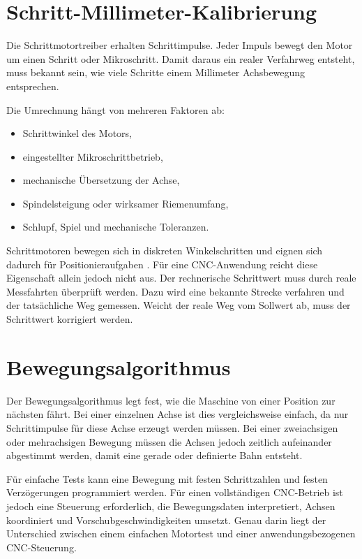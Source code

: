 \section{Schritt-Millimeter-Kalibrierung}
\label{sec:schritt_mm_kalibrierung}

Die Schrittmotortreiber erhalten Schrittimpulse. Jeder Impuls bewegt den Motor um einen Schritt oder Mikroschritt. Damit daraus ein realer Verfahrweg entsteht, muss bekannt sein, wie viele Schritte einem Millimeter Achsbewegung entsprechen.

Die Umrechnung hängt von mehreren Faktoren ab:

\begin{itemize}
	\item Schrittwinkel des Motors,
	\item eingestellter Mikroschrittbetrieb,
	\item mechanische Übersetzung der Achse,
	\item Spindelsteigung oder wirksamer Riemenumfang,
	\item Schlupf, Spiel und mechanische Toleranzen.
\end{itemize}

Schrittmotoren bewegen sich in diskreten Winkelschritten und eignen sich dadurch für Positionieraufgaben \cite{Schroeder:2017}. Für eine CNC-Anwendung reicht diese Eigenschaft allein jedoch nicht aus. Der rechnerische Schrittwert muss durch reale Messfahrten überprüft werden. Dazu wird eine bekannte Strecke verfahren und der tatsächliche Weg gemessen. Weicht der reale Weg vom Sollwert ab, muss der Schrittwert korrigiert werden.

\section{Bewegungsalgorithmus}
\label{sec:bewegungsalgorithmus}

Der Bewegungsalgorithmus legt fest, wie die Maschine von einer Position zur nächsten fährt. Bei einer einzelnen Achse ist dies vergleichsweise einfach, da nur Schrittimpulse für diese Achse erzeugt werden müssen. Bei einer zweiachsigen oder mehrachsigen Bewegung müssen die Achsen jedoch zeitlich aufeinander abgestimmt werden, damit eine gerade oder definierte Bahn entsteht.

Für einfache Tests kann eine Bewegung mit festen Schrittzahlen und festen Verzögerungen programmiert werden. Für einen vollständigen CNC-Betrieb ist jedoch eine Steuerung erforderlich, die Bewegungsdaten interpretiert, Achsen koordiniert und Vorschubgeschwindigkeiten umsetzt. Genau darin liegt der Unterschied zwischen einem einfachen Motortest und einer anwendungsbezogenen CNC-Steuerung.

